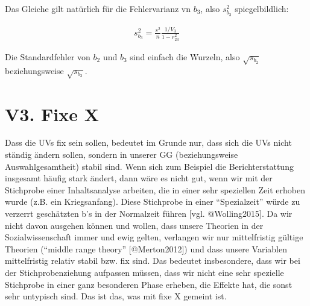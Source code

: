 \documentclass[
  10pt,
  letterpaper,
  a4paper, twoside]{scrreprt}
\begin{document}
\begin{tcolorbox}
Das Gleiche gilt natürlich für die Fehlervarianz vn \(b_3\), also
\(s_{b_3}^2\) spiegelbildlich:

\begin{align} 
s_{b_3}^2=\frac{s^2}{n} \frac{1 / V_3}{1-r_{23}^2} \label{eq-2.153}
\end{align}

Die Standardfehler von \(b_2\) und \(b_3\) sind einfach die Wurzeln,
also \(\sqrt{s_{b_2}}\) beziehungsweise \(\sqrt{s_{b_3}}\).

\end{tcolorbox}

\section{V3. Fixe X}\label{v3.-fixe-x}

Dass die UVs fix sein sollen, bedeutet im Grunde nur, dass sich die UVs
nicht ständig ändern sollen, sondern in unserer GG (beziehungsweise
Auswahlgesamtheit) stabil sind. Wenn sich zum Beispiel die
Berichterstattung insgesamt häufig stark ändert, dann wäre es nicht gut,
wenn wir mit der Stichprobe einer Inhaltsanalyse arbeiten, die in einer
sehr speziellen Zeit erhoben wurde (z.B. ein Kriegsanfang). Diese
Stichprobe in einer \enquote{Spezialzeit} würde zu verzerrt geschätzten
b's in der Normalzeit führen {[}vgl. @Wolling2015{]}. Da wir nicht davon
ausgehen können und wollen, dass unsere Theorien in der
Sozialwissenschaft immer und ewig gelten, verlangen wir nur
mittelfristig gültige Theorien (\enquote{middle range theory}
{[}@Merton2012{]}) und dass unsere Variablen mittelfristig relativ
stabil bzw. fix sind. Das bedeutet insbesondere, dass wir bei der
Stichprobenziehung aufpassen müssen, dass wir nicht eine sehr spezielle
Stichprobe in einer ganz besonderen Phase erheben, die Effekte hat, die
sonst sehr untypisch sind. Das ist das, was mit fixe X gemeint ist.
\end{document}
